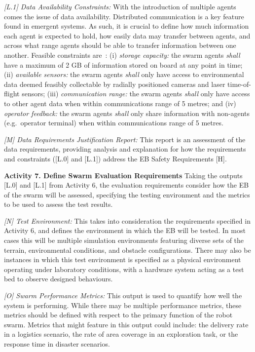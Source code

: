 \documentclass[runningheads]{llncs}
\begin{document}
\emph{[L.1] Data Availability Constraints:}
With the introduction of multiple agents comes the issue of data availability. Distributed communication is a key feature found in emergent systems. As such, it is crucial to define how much information each agent is expected to hold, how easily data may transfer between agents, and across what range agents should be able to transfer information between one another. Feasible constraints are~\cite{Jones2022}: (i) \emph{storage capacity: }the swarm agents \emph{shall} have a maximum of 2 GB of information stored on board at any point in time; (ii) \emph{available sensors:} the swarm agents \emph{shall} only have access to environmental data deemed feasibly collectable by radially positioned cameras and laser time-of-flight sensors; (iii) \emph{communication range:} the swarm agents \emph{shall} only have access to other agent data when within communications range of 5 metres; and (iv) \emph{operator feedback:} the swarm agents \emph{shall} only share information with non-agents (e.g.\ operator terminal) when within communications range of 5 metres.

\emph{[M] Data Requirements Justification Report:}
This report is an assessment of the data requirements, providing analysis and explanation for how the requirements and constraints ([L.0] and [L.1]) address the EB Safety Requirements [H].

\noindent\textbf{Activity 7. Define Swarm Evaluation Requirements} Taking the outputs [L.0] and [L.1] from Activity 6, the evaluation requirements consider how the EB of the swarm will be assessed, specifying the testing environment and the metrics to be used to assess the test results. %

\emph{[N] Test Environment:} This takes into consideration the requirements specified in Activity 6, and defines the environment in which the EB will be tested. In most cases this will be multiple simulation environments featuring diverse sets of the terrain, environmental conditions, and obstacle configurations. There may also be instances in which this test environment is specified as a physical environment operating under laboratory conditions, with a hardware system acting as a test bed to observe designed behaviours.

\emph{[O] Swarm Performance Metrics:} This output is used to quantify how well the system is performing. While there may be multiple performance metrics, these metrics should be defined with respect to the primary function of the robot swarm. Metrics that might feature in this output could include: the delivery rate in a logistics scenario, the rate of area coverage in an exploration task, or the response time in disaster scenarios.
\end{document}
